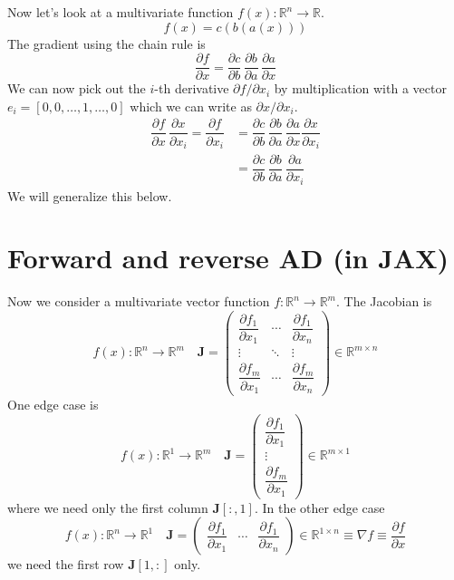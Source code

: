 \documentclass[paper=a4,11pt,headsepline]{scrartcl}
\newcommand{\ve}[1]{\ensuremath{\bm{\mathit{#1}}}}
\newcommand{\ma}[1]{\ensuremath{\bm{\mathbf{#1}}}}
\newcommand{\ra}{\ensuremath{\rightarrow}}
\newcommand{\pd}[2]{\dfrac{\partial #1}{\partial #2}}
\newcommand{\pdi}[2]{\partial #1/\partial #2}
\begin{document}
Now let's look at a multivariate function $f(\ve x): \mathbb R^n \ra \mathbb R$.
\begin{equation*}
    f(\ve x) = c(b(a(\ve x)))
\end{equation*}
The gradient using the chain rule is
\begin{equation*}
    \pd{f}{\ve x} = \pd{c}{b}\,\pd{b}{a}\,\pd{a}{\ve x}
\end{equation*}
We can now pick out the $i$-th derivative $\pdi{f}{x_i}$ by multiplication with
a vector
$\ve e_i = [0,0,\ldots,1,\ldots, 0]$ which we can write as $\pdi{\ve x}{x_i}$.
\begin{align*}
    \pd{f}{\ve x}\,\pd{\ve x}{x_i} = \pd{f}{x_i}
        &= \pd{c}{b}\,\pd{b}{a}\,\pd{a}{\ve x}\pd{\ve x}{x_i}\\
        &= \pd{c}{b}\,\pd{b}{a}\,\pd{a}{x_i}
\end{align*}
We will generalize this below.

\section*{Forward and reverse AD (in JAX)}
Now we consider a multivariate vector function $\ve f: \mathbb R^n \ra \mathbb R^m$.
The Jacobian is
\begin{equation*}
    \ve f(\ve x): \mathbb R^n \ra \mathbb R^m\quad \ma J =
        \begin{pmatrix}
            \pd{f_1}{x_1} & \cdots & \pd{f_1}{x_n}  \\
            \vdots        & \ddots & \vdots         \\
            \pd{f_m}{x_1} & \cdots & \pd{f_m}{x_n}
        \end{pmatrix}
    \in\mathbb R^{m\times n}
\end{equation*}
One edge case is
\begin{equation*}
    \ve f(x): \mathbb R^1 \ra \mathbb R^m\quad \ma J =
        \begin{pmatrix}
            \pd{f_1}{x_1}  \\
            \vdots         \\
            \pd{f_m}{x_1}
        \end{pmatrix}
    \in\mathbb R^{m\times 1}
\end{equation*}
where we need only the first column $\ma J[:,1]$. In the other edge case
\begin{equation*}
f(\ve x): \mathbb R^n \ra \mathbb R^1\quad \ma J =
    \begin{pmatrix}
        \pd{f_1}{x_1} & \cdots & \pd{f_1}{x_n}
    \end{pmatrix}
    \in\mathbb R^{1\times n}
    \equiv \nabla f\equiv \pd{f}{\ve x}
\end{equation*}
we need the first row $\ma J[1,:]$ only.
\end{document}

